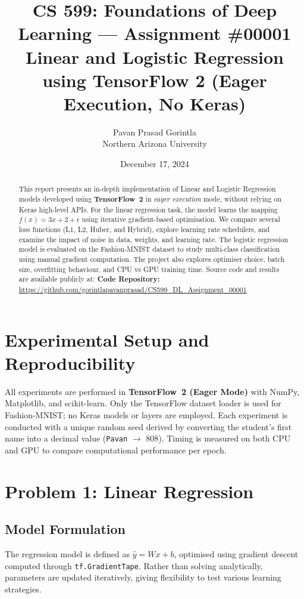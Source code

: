 \documentclass{article}
\title{CS 599: Foundations of Deep Learning --- Assignment \#00001\\
Linear and Logistic Regression using TensorFlow 2 (Eager Execution, No Keras)}
\author{Pavan Prasad Gorintla\\Northern Arizona University}
\date{December 17, 2024}
\begin{document}
\maketitle

\begin{abstract}
This report presents an in-depth implementation of Linear and Logistic Regression models developed using \textbf{TensorFlow~2} in \emph{eager execution} mode, without relying on Keras high-level APIs. For the linear regression task, the model learns the mapping $f(x) = 3x + 2 + \epsilon$ using iterative gradient-based optimisation. We compare several loss functions (L1, L2, Huber, and Hybrid), explore learning rate schedulers, and examine the impact of noise in data, weights, and learning rate. The logistic regression model is evaluated on the Fashion-MNIST dataset to study multi-class classification using manual gradient computation. The project also explores optimiser choice, batch size, overfitting behaviour, and CPU vs GPU training time. Source code and results are available publicly at:  
\textbf{Code Repository:} \\
\url{https://github.com/gorintlapavanprasad/CS599\_DL\_Assignment\_00001}
\end{abstract}

\section{Experimental Setup and Reproducibility}
All experiments are performed in \textbf{TensorFlow~2 (Eager Mode)} with NumPy, Matplotlib, and scikit-learn. Only the TensorFlow dataset loader is used for Fashion-MNIST; no Keras models or layers are employed. Each experiment is conducted with a unique random seed derived by converting the student's first name into a decimal value (\texttt{Pavan} $\to$ 808). Timing is measured on both CPU and GPU to compare computational performance per epoch.

\section{Problem 1: Linear Regression}
\subsection{Model Formulation}
The regression model is defined as $\hat{y} = Wx + b$, optimised using gradient descent computed through \texttt{tf.GradientTape}. Rather than solving analytically, parameters are updated iteratively, giving flexibility to test various learning strategies.
\end{document}
